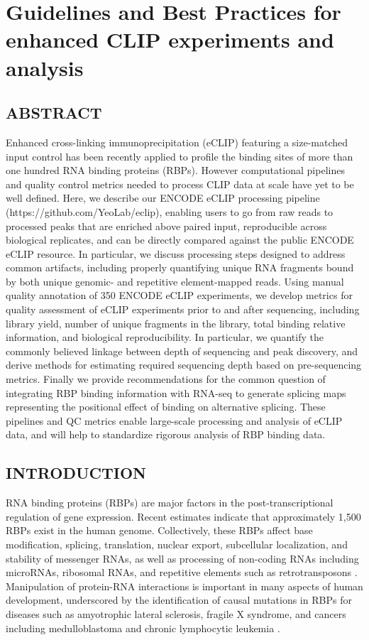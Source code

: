 \chapter{Guidelines and Best Practices for enhanced CLIP experiments and analysis}

\section{ABSTRACT}

Enhanced cross-linking immunoprecipitation (eCLIP) featuring a size-matched input control has been recently applied to profile the binding sites of more than one hundred RNA binding proteins (RBPs). However computational pipelines and quality control metrics needed to process CLIP data at scale have yet to be well defined. Here, we describe our ENCODE eCLIP processing pipeline (https://github.com/YeoLab/eclip), enabling users to go from raw reads to processed peaks that are enriched above paired input, reproducible across biological replicates, and can be directly compared against the public ENCODE eCLIP resource. In particular, we discuss processing steps designed to address common artifacts, including properly quantifying unique RNA fragments bound by both unique genomic- and repetitive element-mapped reads. Using manual quality annotation of 350 ENCODE eCLIP experiments, we develop metrics for quality assessment of eCLIP experiments prior to and after sequencing, including library yield, number of unique fragments in the library, total binding relative information, and biological reproducibility. In particular, we quantify the commonly believed linkage between depth of sequencing and peak discovery, and derive methods for estimating required sequencing depth based on pre-sequencing metrics. Finally we provide recommendations for the common question of integrating RBP binding information with RNA-seq to generate splicing maps representing the positional effect of binding on alternative splicing. These pipelines and QC metrics enable large-scale processing and analysis of eCLIP data, and will help to standardize rigorous analysis of RBP binding data.
 
\section{INTRODUCTION}
RNA binding proteins (RBPs) are major factors in the post-transcriptional regulation of gene expression. Recent estimates indicate that approximately 1,500 RBPs exist in the human genome\cite{Rutherford2008}. Collectively, these RBPs affect base modification, splicing, translation, nuclear export, subcellular localization, and stability of messenger RNAs, as well as processing of non-coding RNAs including microRNAs, ribosomal RNAs, and repetitive elements such as retrotransposons \cite{Bartel2004,Henras2015,Hung2015,Zarnack2013}. Manipulation of protein-RNA interactions is important in many aspects of human development, underscored by the identification of causal mutations in RBPs for diseases such as amyotrophic lateral sclerosis, fragile X syndrome, and cancers including medulloblastoma and chronic lymphocytic leukemia \cite{Daoud2009,Verkerk1991,Pugh2012,Wang2011}.

